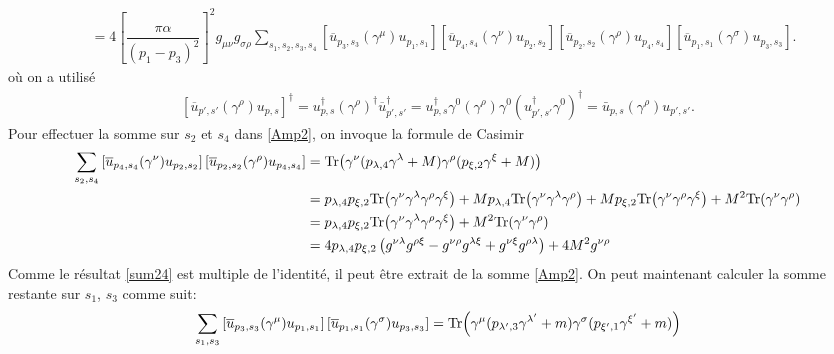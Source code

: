 {\begin{alphaparts}
\begin{align}
        &= 4\left[\dfrac{\pi \alpha }{(p_1 - p_3)^2}\right]^2 g_{\mu \nu} g_{\sigma \rho} \sum_{s_1, s_2, s_3, s_4}\left[\overline{u}_{p_3, s_3} (\gamma^\mu) u_{p_1, s_1}\right]  \left[ \overline{u}_{p_4, s_4} (\gamma^\nu) u_{p_2, s_2} \right]  \left[ \overline{u}_{p_2, s_2} (\gamma^\rho) u_{p_{4}, s_{4}} \right] \left[\overline{u}_{p_1, s_1} (\gamma^\sigma) u_{p_{3}, s_{3}}\right]. \label{Amp2}
    \end{align} 
    où on a utilisé
    \begin{align}
        \left[  \overline{u}_{p', s'} (\gamma^\rho) u_{p, s} \right]^\dagger =   u_{p, s}^\dagger (\gamma^\rho)^\dagger \overline{u}_{p', s'}^\dagger  =  u_{p, s}^\dagger \gamma^0 (\gamma^\rho) \gamma^0  (u_{p', s'}^\dagger\gamma^0)^\dagger  = \bar{u}_{p, s} (\gamma^\rho)  u_{p', s'}.
    \end{align}
    Pour effectuer la somme sur $s_2$ et $s_{4}$ dans \eqref{Amp2}, on invoque la formule de Casimir 
    \begin{align}
        \sum_{s_2, s_{4}}  \left[ \overline{u}_{p_4, s_4} (\gamma^\nu) u_{p_2, s_2} \right]  \left[ \overline{u}_{p_2, s_2} (\gamma^\rho) u_{p_{4}, s_{4}} \right] &= \text{Tr}\qty(\gamma^\nu(p_{\lambda, 4} \gamma^\lambda + M) \gamma^\rho (p_{\xi, 2} \gamma^\xi + M))\nonumber\\
        &=  p_{\lambda, 4}p_{\xi, 2} \text{Tr}\qty(\gamma^\nu\gamma^\lambda \gamma^\rho \gamma^\xi) + M p_{\lambda, 4} \text{Tr}\qty(\gamma^\nu \gamma^\lambda \gamma^\rho) + M p_{\xi, 2} \text{Tr}\qty(\gamma^\nu \gamma^\rho \gamma^\xi) + M^2 \text{Tr}\qty(\gamma^\nu \gamma^\rho) \nonumber\\
        &= p_{\lambda, 4}p_{\xi, 2} \text{Tr}\qty(\gamma^\nu\gamma^\lambda \gamma^\rho \gamma^\xi) + M^2 \text{Tr}\qty(\gamma^\nu \gamma^\rho) \nonumber\\
        &= 4 p_{\lambda, 4}p_{\xi, 2} \left(g^{\nu \lambda} g^{\rho \xi}-g^{\nu \rho} g^{\lambda \xi}+g^{\nu \xi} g^{\rho \lambda}\right) + 4 M^2 g^{\nu \rho}\label{sum24}
    \end{align}
    Comme le résultat \eqref{sum24} est multiple de l'identité, il peut être extrait de la somme \eqref{Amp2}. On peut maintenant calculer la somme restante sur $s_1$, $s_3$ comme suit:
    \begin{align}
        \sum_{s_1, s_{3}}  \left[ \overline{u}_{p_3, s_3} (\gamma^\mu) u_{p_1, s_1} \right]  \left[ \overline{u}_{p_1, s_1} (\gamma^\sigma) u_{p_{3}, s_{3}} \right] &= \text{Tr}\qty(\gamma^\mu(p_{\lambda', 3} \gamma^{\lambda'} + m) \gamma^\sigma (p_{\xi', 1} \gamma^{\xi'} + m))\nonumber\\

\end{align}
\end{alphaparts}}
